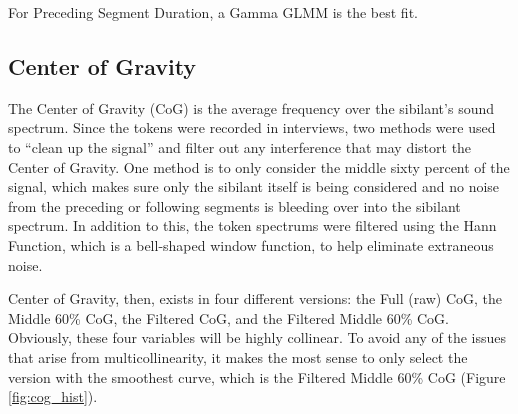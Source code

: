 \documentclass[a4paper]{article}
\begin{document}
For Preceding Segment Duration, a Gamma GLMM is the best fit.

\subsection*{Center of Gravity}
The Center of Gravity (CoG) is the average frequency over the sibilant's
sound spectrum.  Since the tokens were recorded in interviews, two methods
were used to ``clean up the signal'' and filter out any interference
that may distort the Center of Gravity.  One method is to only
consider the middle sixty percent of the signal, which makes sure only
the sibilant itself is being considered and no noise from the preceding
or following segments is bleeding over into the sibilant spectrum.  In
addition to this, the token spectrums were filtered using the Hann
Function, which is a bell-shaped window function, to help eliminate
extraneous noise.

Center of Gravity, then, exists in four different versions: the Full (raw)
CoG, the Middle 60\% CoG, the Filtered CoG, and the Filtered Middle
60\% CoG.  Obviously, these four variables will be highly collinear.
To avoid any of the issues that arise from multicollinearity, it makes
the most sense to only select the version with the smoothest curve, which
is the Filtered Middle 60\% CoG (Figure \ref{fig:cog_hist}).
\end{document}

